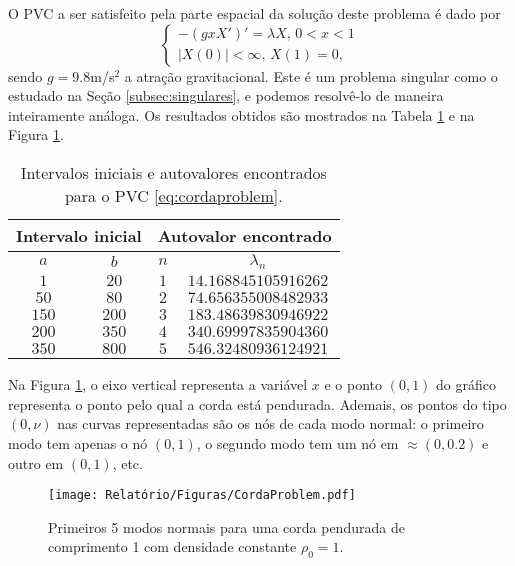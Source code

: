 \documentclass[twocolumn,showpacs,%
  nofootinbib,aps,superscriptaddress,%
  eqsecnum,prd,notitlepage,showkeys,10pt]{revtex4-1}
\begin{document}
O PVC a ser satisfeito pela parte espacial da solução deste problema é dado por
%
\begin{equation}
\label{eq:cordaproblem}
    \left\{
        \begin{array}{l}
            -(gxX')' = \lambda X, \, 0 < x < 1 \\ 
            |X(0)| < \infty, \, X(1) = 0,
        \end{array}
    \right.
\end{equation}
%
sendo $g = 9.8$m/s$^2$ a atração gravitacional. Este é um problema singular como
o estudado na Seção \ref{subsec:singulares}, e podemos resolvê-lo de maneira inteiramente
análoga. Os resultados obtidos são mostrados na Tabela \ref{tab:cordaproblem}
e na Figura \ref{fig:cordaproblem}.
%
\begin{table}[H]
    \centering
    \caption{Intervalos iniciais e autovalores encontrados para o PVC \eqref{eq:cordaproblem}.}
    \begin{tabular}{cc|cc}
        \multicolumn{2}{c}{Intervalo inicial} & \multicolumn{2}{c}{Autovalor encontrado} \\
        \hline
        $a$ & $b$ & $n$ & $\lambda_n$ \\
        \hline
        $1$ & $20$ & $1$ & $14.168845105916262$ \\
        $50$ & $80$ & $2$ & $74.656355008482933$ \\
        $150$ & $200$ & $3$ & $183.48639830946922$ \\
        $200$ & $350$ & $4$ & $340.69997835904360$ \\
        $350$ & $800$ & $5$ & $546.32480936124921$ \\
        \hline
    \end{tabular}
    \label{tab:cordaproblem}
\end{table}
%
Na Figura \ref{fig:cordaproblem}, o eixo vertical representa a variável $x$
e o ponto $(0,1)$ do gráfico representa o ponto pelo qual a corda está pendurada.
Ademais, os pontos do tipo $(0,\nu)$ nas curvas representadas são os nós
de cada modo normal: o primeiro modo tem apenas o nó $(0,1)$, o segundo modo tem um
nó em $\approx(0,0.2)$ e outro em $(0,1)$, etc.
%
\begin{figure}[H]
    \centering
    \texttt{[image: Relatório/Figuras/CordaProblem.pdf]}
    \caption{Primeiros 5 modos normais para uma corda pendurada de comprimento 1
    com densidade constante $\rho_0 = 1$.}
    \label{fig:cordaproblem}
\end{figure}
%
\end{document}
